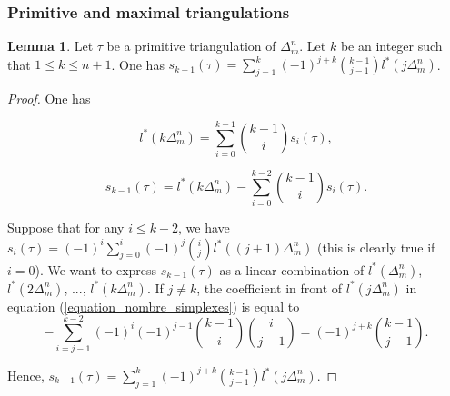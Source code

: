 \documentclass[12pt]{article}
\theoremstyle{definition}
\newtheorem{lem}{Lemma}[section]
\begin{document}
\subsubsection{Primitive and maximal triangulations}

\begin{lem}
    Let $\tau$ be a primitive triangulation of $\Delta_m^n$. Let $k$ be an integer such that $1 \leq k \leq n+1$. One has $s_{k-1}(\tau) = \sum_{j=1}^k (-1)^{j+k} {k-1 \choose j-1} l^*(j \Delta_m^n)$.
\end{lem}


\begin{proof}
    One has

\begin{equation*}
    l^*(k\Delta_m^n) = \sum_{i=0}^{k-1} {k-1 \choose i} s_i(\tau),
\end{equation*}

\begin{equation}
    \label{equation_nombre_simplexes}
    s_{k-1}(\tau) = l^*(k\Delta_m^n) - \sum_{i=0}^{k-2} {k-1 \choose i} s_i(\tau).
\end{equation}

    Suppose that for any $i\leq k-2$, we have $s_i(\tau) = (-1)^i\sum_{j=0}^i (-1)^j {i \choose j} l^*((j+1)\Delta_m^n)$ (this is clearly true if $i=0$). We want to express $s_{k-1}(\tau)$ as a linear combination of $l^*(\Delta_m^n)$, $l^*(2\Delta_m^n)$, ..., $l^*(k\Delta_m^n)$. If $j \neq k$, the coefficient in front of $l^*(j\Delta_m^n)$ in equation (\ref{equation_nombre_simplexes}) is equal to
    \begin{equation*}
        - \sum_{i = j-1}^{k-2} (-1)^i (-1)^{j-1} {k-1 \choose i} {i \choose j-1} = (-1)^{j+k} {k-1 \choose j-1}.
    \end{equation*}
    
    Hence, $s_{k-1}(\tau) = \sum_{j=1}^k (-1)^{j+k} {k-1 \choose j-1} l^*(j \Delta_m^n)$.
\end{proof}
\end{document}
